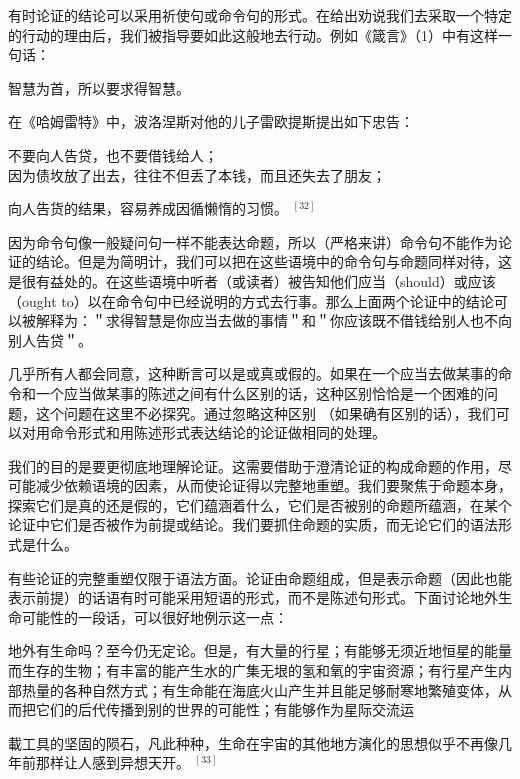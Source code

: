有时论证的结论可以采用祈使句或命令句的形式。在给出劝说我们去采取一个特定的行动的理由后，我们被指导要如此这般地去行动。例如《箴言》（1）中有这样一句话：

\begin{displayquote}
智慧为首，所以要求得智慧。
\end{displayquote}

在《哈姆雷特》中，波洛涅斯对他的儿子雷欧提斯提出如下忠告：

\begin{displayquote}
不要向人告贷，也不要借钱给人；\\
因为债坆放了出去，往往不但丢了本钱，而且还失去了朋友；
\end{displayquote}

向人告货的结果，容易养成因循懒惰的习惯。 ${ }^{[32]}$

因为命令句像一般疑问句一样不能表达命题，所以（严格来讲）命令句不能作为论证的结论。但是为简明计，我们可以把在这些语境中的命令句与命题同样对待，这是很有益处的。在这些语境中听者（或读者）被告知他们应当（should）或应该（ought to）以在命令句中已经说明的方式去行事。那么上面两个论证中的结论可以被解释为：＂求得智慧是你应当去做的事情＂和＂你应该既不借钱给别人也不向别人告贷＂。

几乎所有人都会同意，这种断言可以是或真或假的。如果在一个应当去做某事的命令和一个应当做某事的陈述之间有什么区别的话，这种区别恰恰是一个困难的问题，这个问题在这里不必探究。通过忽略这种区别 （如果确有区别的话），我们可以对用命令形式和用陈述形式表达结论的论证做相同的处理。

我们的目的是要更彻底地理解论证。这需要借助于澄清论证的构成命题的作用，尽可能减少依赖语境的因素，从而使论证得以完整地重塑。我们要聚焦于命题本身，探索它们是真的还是假的，它们蕴涵着什么，它们是否被别的命题所蕴涵，在某个论证中它们是否被作为前提或结论。我们要抓住命题的实质，而无论它们的语法形式是什么。

有些论证的完整重塑仅限于语法方面。论证由命题组成，但是表示命题（因此也能表示前提）的话语有时可能采用短语的形式，而不是陈述句形式。下面讨论地外生命可能性的一段话，可以很好地例示这一点：

地外有生命吗？至今仍无定论。但是，有大量的行星；有能够无须近地恒星的能量而生存的生物；有丰富的能产生水的广集无垠的氢和氧的宇宙资源；有行星产生内部热量的各种自然方式；有生命能在海底火山产生并且能足够耐寒地繁殖变体，从而把它们的后代传播到别的世界的可能性；有能够作为星际交流运

載工具的坚固的陨石，凡此种种，生命在宇宙的其他地方演化的思想似乎不再像几年前那样让人感到异想天开。 ${ }^{[33]}$

